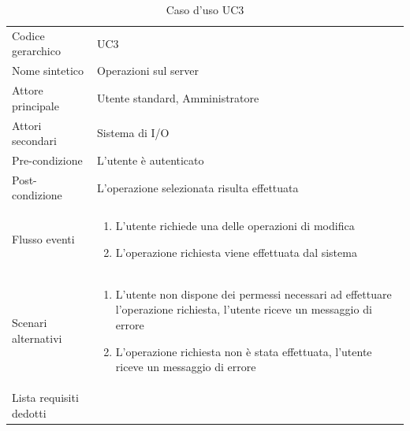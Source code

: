 \documentclass[a4paper]{report}
\begin{document}
		\begin{table}[H]
		\begin{tabularx}{\textwidth}{X | X}\toprule
			\rowcolor{orange!65}Codice gerarchico & UC3 \\
			Nome sintetico & Operazioni sul server \\
			\rowcolor{orange!65}Attore principale & Utente standard, Amministratore\\
			Attori secondari & Sistema di I/O \\
			\rowcolor{orange!65}Pre-condizione & L'utente è autenticato\\
			Post-condizione & L'operazione selezionata risulta effettuata\\
			\rowcolor{orange!65}Flusso eventi & \begin{enumerate}
			\item L'utente richiede una delle operazioni di modifica
			\item L'operazione richiesta viene effettuata dal sistema
			\end{enumerate} \\
			Scenari alternativi & \begin{enumerate}
			\item L'utente non dispone dei permessi necessari ad effettuare l'operazione richiesta, l'utente
			riceve un messaggio di errore
			\item L'operazione richiesta non è stata effettuata, l'utente riceve un messaggio di errore
			\end{enumerate} \\
			\rowcolor{orange!65}Lista requisiti dedotti & \\
			\bottomrule
		\end{tabularx}
		\caption{Caso d'uso UC3}
	 \end{table}
\end{document}
